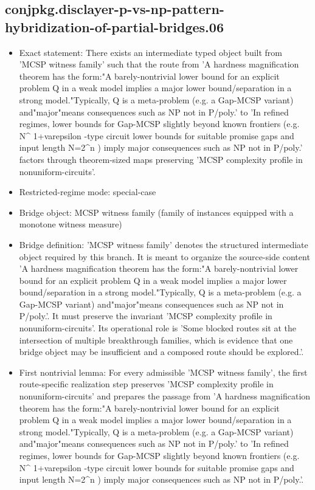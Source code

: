 \documentclass[11pt]{article}
\begin{document}
\subsection*{conjpkg.disclayer-p-vs-np-pattern-hybridization-of-partial-bridges.06}
\begin{itemize}
\item Exact statement: There exists an intermediate typed object built from 'MCSP witness family' such that the route from 'A hardness magnification theorem has the form:"A barely-nontrivial lower bound for an explicit problem Q in a weak model implies a major lower bound/separation in a strong model."Typically, Q is a meta-problem (e.g. a Gap-MCSP variant) and"major"means consequences such as NP not in P/poly.' to 'In refined regimes, lower bounds for Gap-MCSP slightly beyond known frontiers (e.g. N\textasciicircum{} 1+varepsilon -type circuit lower bounds for suitable promise gaps and input length N=2\textasciicircum{}n ) imply major consequences such as NP not in P/poly.' factors through theorem-sized maps preserving 'MCSP complexity profile in nonuniform-circuits'.
\item Restricted-regime mode: special-case
\item Bridge object: MCSP witness family (family of instances equipped with a monotone witness measure)
\item Bridge definition: 'MCSP witness family' denotes the structured intermediate object required by this branch. It is meant to organize the source-side content 'A hardness magnification theorem has the form:"A barely-nontrivial lower bound for an explicit problem Q in a weak model implies a major lower bound/separation in a strong model."Typically, Q is a meta-problem (e.g. a Gap-MCSP variant) and"major"means consequences such as NP not in P/poly.'. It must preserve the invariant 'MCSP complexity profile in nonuniform-circuits'. Its operational role is 'Some blocked routes sit at the intersection of multiple breakthrough families, which is evidence that one bridge object may be insufficient and a composed route should be explored.'.
\item First nontrivial lemma: For every admissible 'MCSP witness family', the first route-specific realization step preserves 'MCSP complexity profile in nonuniform-circuits' and prepares the passage from 'A hardness magnification theorem has the form:"A barely-nontrivial lower bound for an explicit problem Q in a weak model implies a major lower bound/separation in a strong model."Typically, Q is a meta-problem (e.g. a Gap-MCSP variant) and"major"means consequences such as NP not in P/poly.' to 'In refined regimes, lower bounds for Gap-MCSP slightly beyond known frontiers (e.g. N\textasciicircum{} 1+varepsilon -type circuit lower bounds for suitable promise gaps and input length N=2\textasciicircum{}n ) imply major consequences such as NP not in P/poly.'.

\end{itemize}
\end{document}
